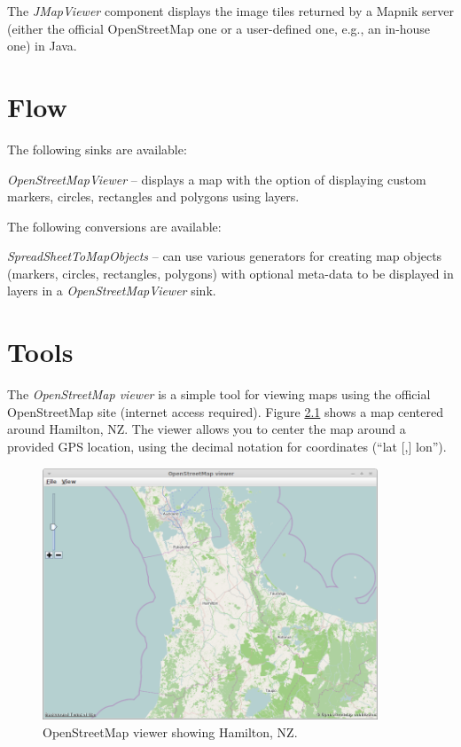 \documentclass[a4paper]{book}
\begin{document}
The \textit{JMapViewer} component \cite{jmapviewer} displays the image tiles 
returned by a Mapnik server (either the official OpenStreetMap one or a 
user-defined one, e.g., an in-house one) in Java.

\chapter{Flow}
The following sinks are available:
\begin{tight_itemize}
	\item \textit{OpenStreetMapViewer} -- displays a map with the option
	of displaying custom markers, circles, rectangles and polygons using layers.
\end{tight_itemize}
The following conversions are available:
\begin{tight_itemize}
	\item \textit{SpreadSheetToMapObjects} -- can use various generators for 
	creating map objects (markers, circles, rectangles, polygons) with 
	optional meta-data to be displayed in layers in a 
	\textit{OpenStreetMapViewer} sink.
\end{tight_itemize}

\chapter{Tools}
The \textit{OpenStreetMap viewer} is a simple tool for viewing maps using
the official OpenStreetMap site (internet access required). 
Figure \ref{openstreetmapviewer} shows a map centered around Hamilton, NZ.
The viewer allows you to center the map around a provided GPS location,
using the decimal notation for coordinates (``lat [,] lon'').

\begin{figure}[htb]
  \centering
  \includegraphics[width=10.0cm]{images/openstreetmapviewer.png}
  \caption{OpenStreetMap viewer showing Hamilton, NZ.}
  \label{openstreetmapviewer}
\end{figure}


\end{document}
